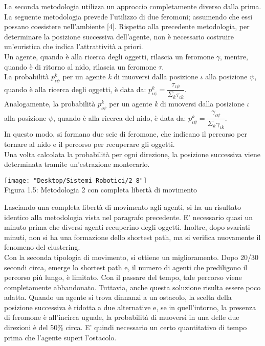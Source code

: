 \documentclass[12pt,a4paper,openright,twoside]{report}
\begin{document}
La seconda metodologia utilizza un approccio completamente diverso dalla prima. La seguente metodologia prevede l'utilizzo di due feromoni; assumendo che essi possano coesistere nell'ambiente [4]. Rispetto alla precedente metodologia, per determinare la posizione successiva dell'agente, non è necessario costruire un'euristica che indica l'attrattività a priori.\\
Un agente, quando è alla ricerca degli oggetti, rilascia un feromone $\gamma$, mentre, quando è di ritorno al nido, rilascia un feromone $\tau$.\\
La probabilità $p^k_{\iota\psi}$ per un agente \textit{k} di muoversi dalla posizione $\iota$ alla posizione $\psi$, quando è alla ricerca degli oggetti, è data da: $p^k_{\iota\psi}= \dfrac{\tau_{\iota\psi}}{\Sigma_k\tau_{\iota k}}$.\\
Analogamente, la probabilità $p^k_{\iota\psi}$ per un agente \textit{k} di muoversi dalla posizione $\iota$ alla posizione $\psi$, quando è alla ricerca del nido, è data da: $p^k_{\iota\psi}= \dfrac{\gamma_{\iota\psi}}{\Sigma_k\gamma_{\iota k}}$.\\
In questo modo, si formano due scie di feromone, che indicano il percorso per tornare al nido e il percorso per recuperare gli oggetti.\\
Una volta calcolata la probabilità per ogni direzione, la posizione successiva viene determinata tramite un'estrazione montecarlo.\\

\begin{center}  
	\texttt{[image: "Desktop/Sistemi Robotici/2\_8"]}
	\\Figura 1.5: Metodologia 2 con completa libertà di movimento
\end{center}

Lasciando una completa libertà di movimento agli agenti, si ha un risultato identico alla metodologia vista nel paragrafo precedente. E' necessario quasi un minuto prima che diversi agenti recuperino degli oggetti. Inoltre, dopo svariati minuti, non si ha una formazione dello shortest path, ma si verifica nuovamente il fenomeno del clustering.\\
Con la seconda tipologia di movimento, si ottiene un miglioramento.  Dopo 20/30 secondi circa, emerge lo shortest path e, il numero di agenti che prediligono il percorso più lungo, è limitato. Con il passare del tempo, tale percorso viene completamente abbandonato. Tuttavia, anche questa soluzione risulta essere poco adatta. Quando un agente si trova dinnanzi a un ostacolo, la scelta della posizione successiva è ridotta a due alternative e, se in quell'intorno, la presenza di feromone è all'incirca uguale, la probabilità di muoversi in una delle due direzioni è del 50\% circa. E' quindi necessario un certo quantitativo di tempo prima che l'agente superi l'ostacolo.\\
\end{document}
